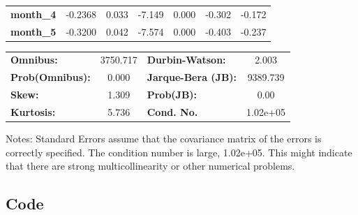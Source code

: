 \begin{center}
\begin{table}[!h]
\begin{tabular}{lcccccc}
    \textbf{month\_4}      &      -0.2368  &        0.033     &    -7.149  &         0.000        &       -0.302    &       -0.172     \\
    \textbf{month\_5}      &      -0.3200  &        0.042     &    -7.574  &         0.000        &       -0.403    &       -0.237     \\
    \bottomrule
    \end{tabular}
    \begin{tabular}{lclc}
    \textbf{Omnibus:}       & 3750.717 & \textbf{  Durbin-Watson:     } &    2.003  \\
    \textbf{Prob(Omnibus):} &   0.000  & \textbf{  Jarque-Bera (JB):  } & 9389.739  \\
    \textbf{Skew:}          &   1.309  & \textbf{  Prob(JB):          } &     0.00  \\
    \textbf{Kurtosis:}      &   5.736  & \textbf{  Cond. No.          } & 1.02e+05  \\
    \bottomrule
    \end{tabular}
\end{table}
    \end{center}
    Notes: \newline
     [1] Standard Errors assume that the covariance matrix of the errors is correctly specified. \newline
     [2] The condition number is large, 1.02e+05. This might indicate that there are \newline
     strong multicollinearity or other numerical problems.

\subsection{Code}



